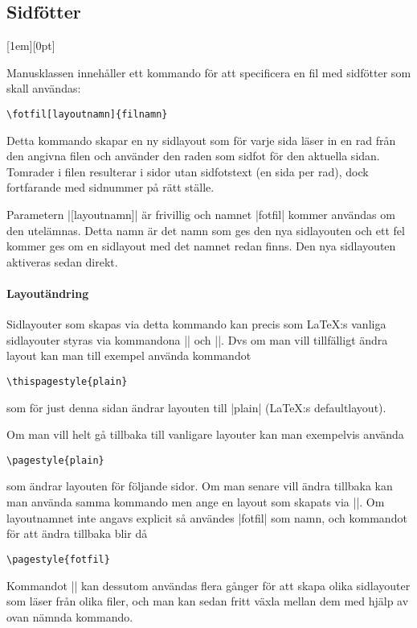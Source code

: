 \documentclass[a4paper,12pt]{article}
\newcommand\funnybone[1]{%
	\raisebox{1em}[1em][0pt]{%
		\makebox[\textwidth][r]{\large\it eller, ``#1''}%
	}%
}
\begin{document}
\subsection{Sidfötter}
\funnybone{Fotfil, smakar som ostbågar}
Manusklassen innehåller ett kommando för att specificera en fil med sidfötter som skall användas:

\begin{lstlisting}
\fotfil[layoutnamn]{filnamn}
\end{lstlisting}

Detta kommando skapar en ny sidlayout som för varje sida läser in en rad från den angivna filen och använder den raden som sidfot för den aktuella sidan. Tomrader i filen resulterar i sidor utan sidfotstext (en sida per rad), dock fortfarande med sidnummer på rätt ställe.

Parametern |[layoutnamn]| är frivillig och namnet |fotfil| kommer användas om den utelämnas. Detta namn är det namn som ges den nya sidlayouten och ett fel kommer ges om en sidlayout med det namnet redan finns. Den nya sidlayouten aktiveras sedan direkt.

\paragraph{Layoutändring} Sidlayouter som skapas via detta kommando kan precis som \LaTeX:s vanliga sidlayouter styras via kommandona |\pagestyle| och |\thispagestyle|. Dvs om man vill tillfälligt ändra layout kan man till exempel använda kommandot
\begin{lstlisting}
\thispagestyle{plain}
\end{lstlisting}
som för just denna sidan ändrar layouten till |plain| (\LaTeX:s defaultlayout).

Om man vill helt gå tillbaka till vanligare layouter kan man exempelvis använda
\begin{lstlisting}
\pagestyle{plain}
\end{lstlisting}
som ändrar layouten för följande sidor. Om man senare vill ändra tillbaka kan man använda samma kommando men ange en layout som skapats via |\fotfil|. Om layoutnamnet inte angavs explicit så användes |fotfil| som namn, och kommandot för att ändra tillbaka blir då
\begin{lstlisting}[keywords={pagestyle}]
\pagestyle{fotfil}
\end{lstlisting}

Kommandot |\fotfil| kan dessutom användas flera gånger för att skapa olika sidlayouter som läser från olika filer, och man kan sedan fritt växla mellan dem med hjälp av ovan nämnda kommando.
\end{document}
